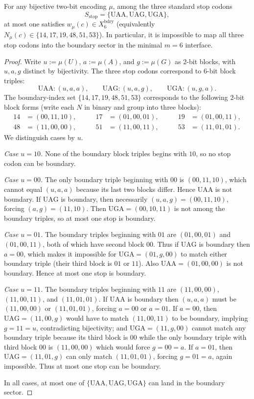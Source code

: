 \begin{proposition}
\label{prop:stop_hits_at_most_one}
For any bijective two-bit encoding $\mu$, among the three standard stop codons
\[
S_{\mathrm{stop}}=\{\mathrm{UAA},\mathrm{UAG},\mathrm{UGA}\},
\]
at most one satisfies $w_\mu(c)\in X_6^{\mathrm{bdry}}$ (equivalently $N_\mu(c)\in\{14,17,19,48,51,53\}$).
In particular, it is impossible to map all three stop codons into the boundary sector in the minimal $m=6$ interface.
\end{proposition}

\begin{proof}
Write $u:=\mu(U)$, $a:=\mu(A)$, and $g:=\mu(G)$ as $2$-bit blocks, with $u,a,g$ distinct by bijectivity.
The three stop codons correspond to $6$-bit block triples:
\[
\mathrm{UAA}: (u,a,a),\qquad
\mathrm{UAG}: (u,a,g),\qquad
\mathrm{UGA}: (u,g,a).
\]
The boundary-index set $\{14,17,19,48,51,53\}$ corresponds to the following $2$-bit block forms (write each $N$ in binary and group into three blocks):
\[
\begin{aligned}
14&=(00,11,10),&\qquad 17&=(01,00,01),&\qquad 19&=(01,00,11),\\
48&=(11,00,00),&\qquad 51&=(11,00,11),&\qquad 53&=(11,01,01).
\end{aligned}
\]
We distinguish cases by $u$.

\emph{Case $u=10$.} None of the boundary block triples begins with $10$, so no stop codon can be boundary.

\emph{Case $u=00$.} The only boundary triple beginning with $00$ is $(00,11,10)$, which cannot equal $(u,a,a)$ because its last two blocks differ. Hence $\mathrm{UAA}$ is not boundary.
If $\mathrm{UAG}$ is boundary, then necessarily $(u,a,g)=(00,11,10)$, forcing $(a,g)=(11,10)$. Then $\mathrm{UGA}=(00,10,11)$ is not among the boundary triples, so at most one stop is boundary.

\emph{Case $u=01$.} The boundary triples beginning with $01$ are $(01,00,01)$ and $(01,00,11)$, both of which have second block $00$. Thus if $\mathrm{UAG}$ is boundary then $a=00$, which makes it impossible for $\mathrm{UGA}=(01,g,00)$ to match either boundary triple (their third block is $01$ or $11$). Also $\mathrm{UAA}=(01,00,00)$ is not boundary. Hence at most one stop is boundary.

\emph{Case $u=11$.} The boundary triples beginning with $11$ are $(11,00,00)$, $(11,00,11)$, and $(11,01,01)$. If $\mathrm{UAA}$ is boundary then $(u,a,a)$ must be $(11,00,00)$ or $(11,01,01)$, forcing $a=00$ or $a=01$.
If $a=00$, then $\mathrm{UAG}=(11,00,g)$ would have to match $(11,00,11)$ to be boundary, implying $g=11=u$, contradicting bijectivity; and $\mathrm{UGA}=(11,g,00)$ cannot match any boundary triple because its third block is $00$ while the only boundary triple with third block $00$ is $(11,00,00)$ which would force $g=00=a$.
If $a=01$, then $\mathrm{UAG}=(11,01,g)$ can only match $(11,01,01)$, forcing $g=01=a$, again impossible. Thus at most one stop can be boundary.

In all cases, at most one of $\{\mathrm{UAA},\mathrm{UAG},\mathrm{UGA}\}$ can land in the boundary sector.
\end{proof}

